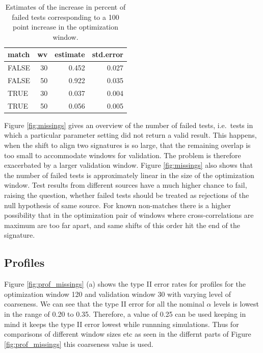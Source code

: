 \documentclass[12pt]{article}
\begin{document}
\begin{table}

\caption{\label{tab:lms}Estimates of the increase in percent of failed tests corresponding to a 100 point increase in the optimization window.}
\centering
\begin{tabular}[t]{lrrr}
\toprule
match & wv & estimate & std.error\\
\midrule
FALSE & 30 & 0.452 & 0.027\\
FALSE & 50 & 0.922 & 0.035\\
TRUE & 30 & 0.037 & 0.004\\
TRUE & 50 & 0.056 & 0.005\\
\bottomrule
\end{tabular}
\end{table}

Figure \ref{fig:missings} gives an overview of the number of failed
tests, i.e.~tests in which a particular parameter setting did not return
a valid result. This happens, when the shift to align two signatures is
so large, that the remaining overlap is too small to accommodate windows
for validation. The problem is therefore exacerbated by a larger
validation window. Figure \ref{fig:missings} also shows that the number
of failed tests is approximately linear in the size of the optimization
window. Test results from different sources have a much higher chance to
fail, raising the question, whether failed tests should be treated as
rejections of the null hypothesis of same source. For known non-matches
there is a higher possibility that in the optimization pair of windows
where cross-correlations are maximum are too far apart, and same shifts
of this order hit the end of the signature.

\subsection{Profiles}\label{profiles-1}

Figure \ref{fig:prof_missings} (a) shows the type II error rates for
profiles for the optimization window 120 and validation window 30 with
varying level of coarseness. We can see that the type II error for all
the nominal \(\alpha\) levels is lowest in the range of 0.20 to 0.35.
Therefore, a value of 0.25 can be used keeping in mind it keeps the type
II error lowest while runnning simulations. Thus for comparisons of
different window sizes etc as seen in the differnt parts of Figure
\ref{fig:prof_missings} this coarseness value is used.
\end{document}

